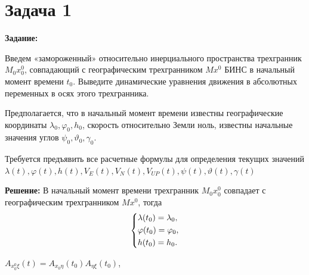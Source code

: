 \documentclass[a4paper,14pt]{article}
\theoremstyle{plain} %
\theoremstyle{definition} %
\theoremstyle{remark} %
\begin{document}
\thispagestyle{empty} %
\normalsize{
\newpage
\tableofcontents
\newpage

\section{Задача 1}
\textbf{Задание:}

Введем «замороженный» относительно инерциального пространства трехгранник $M_0x_0^0$,
совпадающий с географическим трехгранником $Mx^0$ БИНС в начальный момент времени $t_0$.
Выведите динамические уравнения движения в абсолютных переменных в осях этого трехгранника.

Предполагается, что в начальный момент времени известны географические координаты $\lambda_0,\varphi_0,h_0$,
скорость относительно Земли ноль, известны начальные значения углов $\psi_0,\vartheta_0,\gamma_0.$

Требуется предъявить все расчетные формулы для определения текущих значений
$\lambda(t),\varphi(t),h(t),V_E(t),V_N(t),V_{UP}(t),\psi(t),\vartheta(t),\gamma(t)$


\textbf{Решение:}
В начальный момент времени трехгранник $M_0x_0^0$
совпадает с географическим трехгранником $Mx^0$, тогда
\begin{equation}\label{koshisystem}
    \left\{ {\begin{aligned}
                 & \lambda(t_0) = \lambda_0 , \hfill \\
                 & \varphi(t_0) = \varphi_0 , \hfill \\
                 & h(t_0)= h_0 . \hfill              \\
            \end{aligned}} \right.
\end{equation}

$A_{x_{0}^{0} \xi}(t)=A_{x_{0} \eta}\left(t_{0}\right) A_{\eta \xi}\left(t_{0}\right)$,

}
\end{document}
